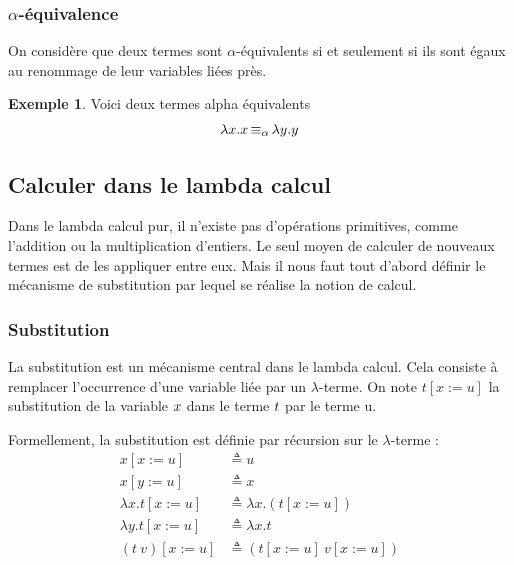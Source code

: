 \documentclass {article}
\theoremstyle{definition}
\newtheorem{example}{Exemple}
\theoremstyle{remark}
\begin{document}
\subsubsection{$\alpha$-équivalence}
\label{alpha_equiv}

\newcommand{\equivAlpha}{\mathop{\equiv_\alpha}}

On considère que deux termes sont \(\alpha\)-équivalents si et seulement si ils sont 
égaux au renommage de leur variables liées près. 
\begin{example}
  Voici deux termes alpha équivalents 
  \begin{align*}
    & \Lam{x}{\Var{x}} \equivAlpha \Lam{y}{\Var{y}} \\
  \end{align*}
\end{example}
  
\subsection{Calculer dans le lambda calcul}
\label{calculer_dans_le_lambda_calcul}

Dans le lambda calcul pur, il n'existe pas d'opérations primitives, comme l'addition ou la multiplication d'entiers. Le seul moyen de calculer de nouveaux termes est de les appliquer 
entre eux. Mais il nous faut tout d'abord définir le mécanisme de substitution par lequel se réalise la notion de calcul.

\subsubsection{Substitution}

\newcommand{\subst}[3]{#1[#2 := #3]}


La substitution est un mécanisme central dans le lambda calcul. Cela consiste 
à remplacer l'occurrence d'une variable liée par un \(\lambda\)-terme.
On note \(\subst{t}{x}{u}\) la substitution de la variable $x$ dans le terme $t$ par le 
terme u.

Formellement, la substitution est définie par récursion sur le $\lambda$-terme :
\begin{align*}
    \subst{x}{x}{u} &\triangleq u \\
    \subst{x}{y}{u} &\triangleq x \\
    \subst{\lambda x.t}{x}{u} &\triangleq \lambda x.(\subst{t}{x}{u}) \\
    \subst{\lambda y.t}{x}{u} &\triangleq \lambda x.t \\
    \subst{(t\: v)}{x}{u} &\triangleq (\subst{t}{x}{u}\: \subst{v}{x}{u}) 
\end{align*}
\end{document}
